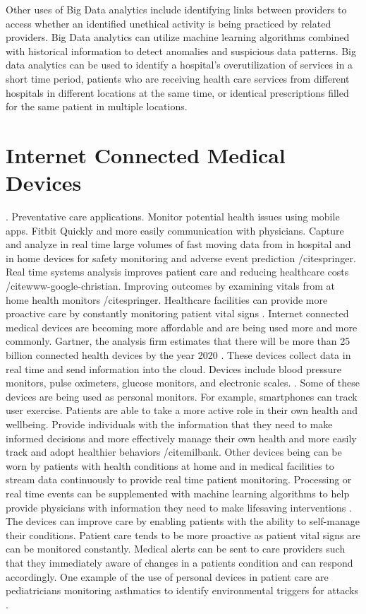 \documentclass[sigconf]{acmart}
\begin{document}
Other uses of Big Data analytics include identifying links between providers to access whether an identified unethical activity is being practiced by related providers.  Big Data analytics can utilize machine learning algorithms combined with historical information to detect anomalies and suspicious data patterns. Big data analytics can be used to identify a hospital’s overutilization of services in a short time period, patients who are receiving health care services from different hospitals in different locations at the same time, or identical prescriptions filled for the same patient in multiple locations. 

\section{Internet Connected Medical Devices}. 
Preventative care applications.  Monitor potential health issues using mobile apps. Fitbit Quickly and more easily communication with physicians. 
Capture and analyze in real time large volumes of fast moving data from in hospital and in home devices for safety monitoring and adverse event prediction /cite{springer}. Real time systems analysis improves patient care and reducing healthcare costs /cite{www-google-christian}.
Improving outcomes by examining vitals from at home health monitors /cite{springer}.
Healthcare facilities can provide more proactive care by constantly monitoring patient vital signs \cite{www-google-McDonald}.
Internet connected medical devices are becoming more affordable and are being used more and more commonly.  Gartner, the analysis firm estimates that there will be more than 25 billion connected health devices by the year 2020 \cite{www-google-HlthCat}. These devices collect data in real time and send information into the cloud. Devices include blood pressure monitors, pulse oximeters, glucose monitors, and electronic scales. \cite{www-google-HlthCat}.  Some of these devices are being used as personal monitors. For example, smartphones can track user exercise.  Patients are able to take a more active role in their own health and wellbeing.
Provide individuals with the information that they need to make informed decisions and more effectively manage their own health and more easily track and adopt healthier behaviors /cite{milbank}.
Other devices being can be worn by patients with health conditions at home and in medical facilities to stream data continuously to provide real time patient monitoring.  Processing or real time events can be supplemented with machine learning algorithms to help provide physicians with information they need to make lifesaving interventions \cite{www-google-McDonald}.  The devices can improve care by enabling patients with the ability to self-manage their conditions. Patient care tends to be more proactive as patient vital signs are can be monitored constantly. Medical alerts can be sent to care providers such that they immediately aware of changes in a patients condition and can respond accordingly. One example of the use of personal devices in patient care are pediatricians monitoring asthmatics to identify environmental triggers for attacks \cite{www-google-CIO}.
\end{document}
